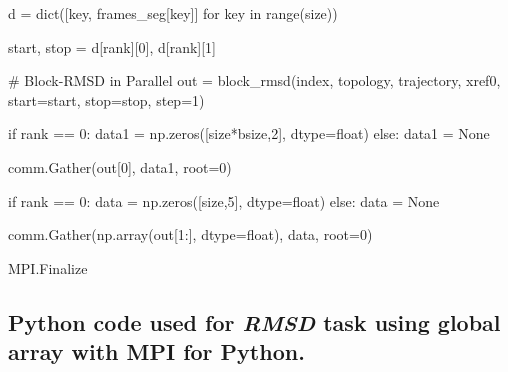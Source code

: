 \begin{python}
d = dict([key, frames_seg[key]] for key in range(size))

start, stop = d[rank][0], d[rank][1]

# Block-RMSD in Parallel
out = block_rmsd(index, topology, trajectory, xref0, start=start, stop=stop, step=1)

if rank == 0:
   data1 = np.zeros([size*bsize,2], dtype=float)
else:
   data1 = None

comm.Gather(out[0], data1, root=0)

if rank == 0:
   data = np.zeros([size,5], dtype=float)
else:
   data = None

comm.Gather(np.array(out[1:], dtype=float), data, root=0)

MPI.Finalize                                                                                                                                                 
\end{python}

\subsection{Python code used for \emph{RMSD} task using global array with MPI for Python.}
\label{sec:codeRMSD-ga}

